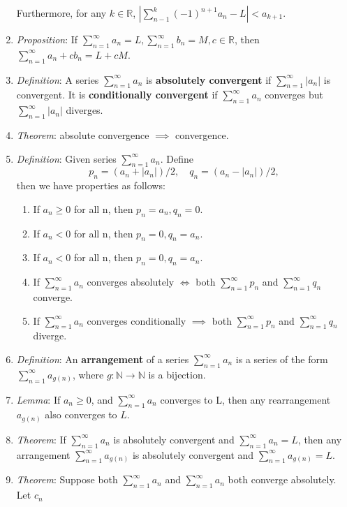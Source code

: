 \message{ !name(cheatsheet.tex)}\documentclass{article}
\newcommand{\infsrsn}[1]{\sum\limits^\infty_{n=1}#1}
\newcommand{\real}{\mathbb{R}}
\newcommand{\nat}{\mathbb{N}}
\begin{document}
\begin{multicols*}{3}
\begin{enumerate}
		      Furthermore, for any $k\in\real$,
		      $|\sum_{n-1}^{k}(-1)^{n+1}a_n-L|<a_{k+1}$.
		\item \emph{Proposition}: If $\infsrsn{a_n}=L, \infsrsn{b_n}=M,
			      c\in\real$, then $\infsrsn{a_n+cb_n}=L+cM$.
		\item \emph{Definition}: A series $\infsrsn{a_n}$ is \textbf{absolutely
			      convergent} if $\infsrsn{|a_n|}$ is convergent. It is
		      \textbf{conditionally convergent} if $\infsrsn{a_n}$ converges but
		      $\infsrsn{|a_n|}$ diverges.
		\item \emph{Theorem}: absolute convergence $\implies$ convergence.
		\item \emph{Definition}: Given series $\infsrsn{a_n}$. Define
		      \[p_n=(a_n+|a_n|)/2,\quad q_n=(a_n-|a_n|)/2,\] then we have properties
		      as follows:
		      \begin{enumerate}
			      \item If $a_n\geq 0$ for all n, then $p_n=a_n,q_n=0$.
			      \item If $a_n<0$ for all n, then $p_n=0,q_n=a_n$.
			      \item If $a_n<0$ for all n, then $p_n=0,q_n=a_n$.
			      \item If $\infsrsn{a_n}$ converges absolutely $\iff$ both
			            $\infsrsn{p_n}$ and $\infsrsn{q_n}$ converge.
			      \item If $\infsrsn{a_n}$ converges conditionally $\implies$
			            both $\infsrsn{p_n}$ and $\infsrsn{q_n}$ diverge.
		      \end{enumerate}
		\item \emph{Definition}: An \textbf{arrangement} of a series
		      $\infsrsn{a_n}$ is a series of the form $\infsrsn{a_{g(n)}}$, where
		      $g:\nat\rightarrow\nat$ is a bijection.
		\item \emph{Lemma}: If $a_{n}\geq0$, and $\infsrsn{a_{n}}$ converges to L,
			then any rearrangement $a_{g(n)}$ also converges to $L$.
		\item \emph{Theorem}: If $\infsrsn{a_{n}}$ is absolutely convergent and
			$\infsrsn{a_{n}}=L$, then any arrangement $\infsrsn{a_{g(n)}}$ is
			absolutely convergent and $\infsrsn{a_{g(n)}}=L$.
		\item \emph{Theorem}: Suppose both $\infsrsn{a_{n}}$ and $\infsrsn{a_{n}}$
			both converge absolutely. Let $c_{n}$
	\end{enumerate}


\end{multicols*}
\end{document}
